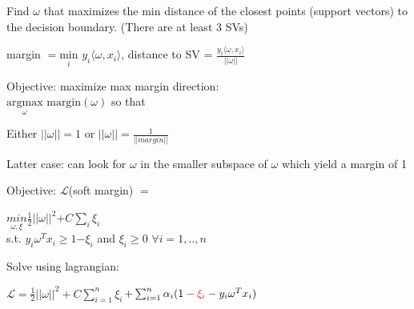 \begin{center}
\end{center}

Find $\omega$ that maximizes the min distance of the closest points (support vectors) to the decision boundary. (There are at least 3 SVs)

margin $ = \underset{i}{\text{min}}$ $y_i\langle\omega, x_i\rangle$, distance to SV = $\frac{y_i\langle\omega, x_i\rangle}{||\omega||}$

Objective: maximize max margin direction: \\
$\underset{\omega}{\text{argmax}}$ $ \text{margin}(\omega)$ so that

Either  $||\omega|| = 1$ or $||\omega|| = \frac{1}{||margin||}$

Latter case: can look for $\omega$ in the smaller subspace of $\omega$ which yield a margin of 1

Objective: $\mathcal{L}$\color{red}(soft margin) \color{black} $=$
\begin{center}
    $\underset{\omega, \xi}{min}\frac{1}{2}||\omega||^2$\color{red}$ + C\sum_i\xi_i$\color{black}\\
    s.t. $y_i\omega^Tx_i \geq 1$\color{red}$- \xi_i$ and $\xi_i \geq 0$ \color{black} $\forall i = 1,..,n$ 
\end{center}


Solve using lagrangian: 
\begin{center}
    $\mathcal{L} = \frac{1}{2}||\omega||^2 +$\color{red}$ C\sum_{i=1}^n\xi_i$\color{black}$ + \sum_{i=1}^n \alpha_i(1-\color{red}\xi_i \color{black} - y_i\omega^Tx_i)$
\end{center}
